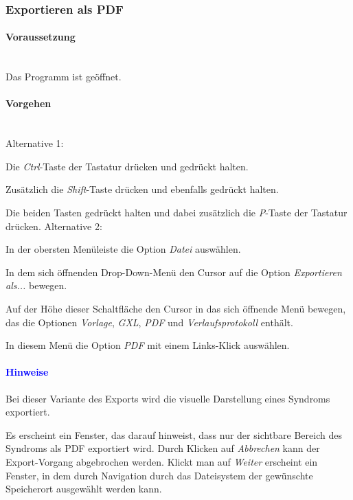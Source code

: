 \documentclass[enabledeprecatedfontcommands,fontsize=11pt,paper=a4,twoside]{scrartcl}
\newcounter{one}
\newcounter{two}[one]
\newcommand*{\hint}{\paragraph{\textcolor{blue}{Hinweise}}}
\newcommand*{\condition}{\paragraph{Voraussetzung}$\;$ \vspace{0.2cm}\\}
\newcommand*{\actions}{\paragraph{Vorgehen} $\;$\vspace{0.2cm}\\}
\newcommand*{\aOne}{\textcolor{bbe}{Alternative 1:}}
\newcommand*{\aTwo}{\textcolor{bbe}{Alternative 2:}}
\let\tempone\itemize
\let\temptwo\enditemize
\renewenvironment{itemize}{\tempone\addtolength{\itemsep}{-10.0pt}}{\temptwo}
\let\origenumerate\enumerate
\let\origendenumerate\endenumerate
\renewenvironment{enumerate}{\origenumerate \addtolength{\itemsep}{-10.0pt}}{\origendenumerate}
\begin{document}
		\subsubsection{Exportieren als PDF}
		\condition 	
		Das Programm ist geöffnet.
		\actions
		\aOne
		\begin{enumerate}
				\item Die \textit{Ctrl}-Taste der Tastatur drücken und gedrückt halten.
				\item Zusätzlich die \textit{Shift}-Taste drücken und ebenfalls gedrückt halten.
				\item Die beiden Tasten gedrückt halten und dabei zusätzlich die \textit{P}-Taste der Tastatur drücken.
		\end{enumerate}				
		\aTwo
		\begin{enumerate}
				\item In der obersten Menüleiste die Option \textit{Datei} auswählen. 
				\item In dem sich öffnenden Drop-Down-Menü den Cursor auf die Option \textit{Exportieren als...} bewegen.
				\item Auf der Höhe dieser Schaltfläche den Cursor in das sich öffnende Menü bewegen, das die Optionen \textit{Vorlage}, \textit{GXL}, \textit{PDF} und \textit{Verlaufsprotokoll} enthält.
				\item In diesem Menü die Option \textit{PDF} mit einem Links-Klick auswählen.
		\end{enumerate}		
		\hint
		\begin{itemize}
				\item Bei dieser Variante des Exports wird die visuelle Darstellung eines Syndroms exportiert.
				\item Es erscheint ein Fenster, das darauf hinweist, dass nur der sichtbare Bereich des Syndroms als PDF exportiert wird. Durch Klicken auf \textit{Abbrechen} kann der Export-Vorgang abgebrochen werden. Klickt man auf \textit{Weiter} erscheint ein Fenster, in dem durch Navigation durch das Dateisystem der gewünschte Speicherort ausgewählt werden kann. \\
		\end{itemize}
		
\end{document}
